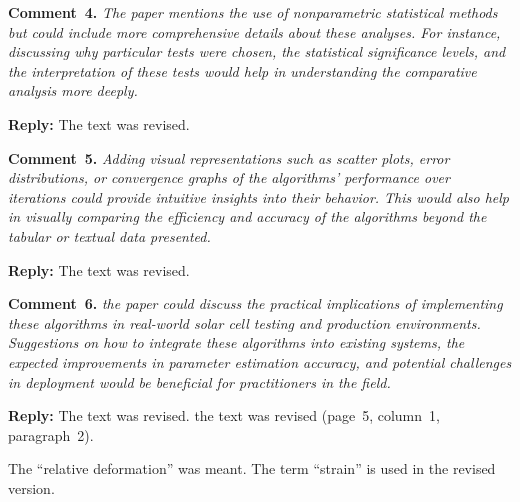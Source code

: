 \documentclass[a4paper,fleqn]{cas-sc}
\begin{document}
\vspace{1cm}
\noindent
\textcolor[rgb]{0.00,0.50,1.00}{\textbf{Comment~4.}}
\emph{The paper mentions the use of nonparametric statistical methods but could include more comprehensive details about these analyses. 
For instance, discussing why particular tests were chosen, the statistical significance levels,
 and the interpretation of these tests would help in understanding the comparative analysis more deeply.}

\noindent
\textcolor[rgb]{0.51,0.00,0.00}{\textbf{Reply:}}
The text was revised.


\vspace{1cm}
\noindent
\textcolor[rgb]{0.00,0.50,1.00}{\textbf{Comment~5.}}
\emph{ Adding visual representations such as scatter plots, error distributions, 
or convergence graphs of the algorithms' performance over iterations could provide intuitive insights into their behavior. 
This would also help in visually comparing the efficiency and accuracy of the algorithms beyond the tabular or textual data presented.}

\noindent
\textcolor[rgb]{0.51,0.00,0.00}{\textbf{Reply:}}
The text was revised.


\vspace{1cm}
\noindent
\textcolor[rgb]{0.00,0.50,1.00}{\textbf{Comment~6.}}
\emph{ the paper could discuss the practical implications of implementing these algorithms 
in real-world solar cell testing and production environments. 
Suggestions on how to integrate these algorithms into existing systems, the expected improvements 
in parameter estimation accuracy, and potential challenges in deployment would be beneficial for practitioners in the field.}

\noindent
\textcolor[rgb]{0.51,0.00,0.00}{\textbf{Reply:}}
The text was revised.
the text was revised (page~5, column~1, paragraph~2).

The ``relative deformation'' was meant.
The term ``strain'' is used in the revised version.



%
\end{document}
